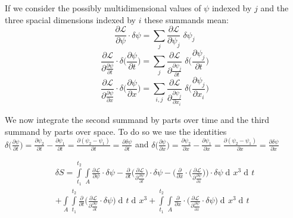 \documentclass{article}
\DeclareMathOperator{\dd}{d\!}
\begin{document}
If we consider the possibly multidimensional values of $\psi$ indexed by $j$ and the three spacial dimensions indexed by $i$ these summands mean:
\begin{equation}
\frac{\partial \mathcal{L}}{\partial \psi} \cdot \delta \psi 
= \sum_{j} \frac{\partial \mathcal{L}}{\partial \psi_{j}} \; \delta \psi_{j} 
\end{equation}
\begin{equation}
\frac{\partial \mathcal{L}}{\partial \frac{\partial \psi}{\partial t}} \cdot \delta \bigg(\frac{\partial \psi} {\partial t}\bigg)
= \sum_{j} \frac{\partial \mathcal{L}}{\partial \frac{\partial \psi_{j}}{\partial t}} \; \delta \bigg(\frac{\partial \psi_{j}} {\partial t}\bigg)
\end{equation}
\begin{equation}
\frac{\partial \mathcal{L}}{\partial \frac{\partial \psi}{\partial x}} \cdot \delta \bigg(\frac{\partial \psi} {\partial x}\bigg)
= \sum_{i,j} \frac{\partial \mathcal{L}}{\partial \frac{\partial \psi_{j}}{\partial x_{i}}} \; \delta \bigg(\frac{\partial \psi_{j}} {\partial x_{i}}\bigg)
\end{equation}

We now integrate the second summand by parts over time and the third summand by parts over space. To do so we use the identities 
$\delta \big(\frac{\partial \psi} {\partial t}\big)
= \frac{\partial \psi_2} {\partial t} - \frac{\partial \psi_1} {\partial t}
= \frac{\partial (\psi_2 - \psi_1)} {\partial t}
= \frac{\partial \delta \psi} {\partial t}$ 
and
$\delta \big(\frac{\partial \psi} {\partial x}\big)
= \frac{\partial \psi_2} {\partial x} - \frac{\partial \psi_1} {\partial x}
= \frac{\partial (\psi_2 - \psi_1)} {\partial x}
= \frac{\partial \delta \psi} {\partial x}$ 

\begin{equation} \label{calcDeltaSSection2}
\begin{split}
\delta S = \int\limits_{t_1}^{t_2} \int\limits_{A} 
\frac{\partial \mathcal{L}}{\partial \psi} \cdot \delta \psi
-\frac{\partial}{\partial t} \bigg( \frac{\partial \mathcal{L}}{\partial \frac{\partial \psi}{\partial t}} \bigg) \cdot \delta \psi
-\bigg(\frac{\partial}{\partial x} \cdot \bigg( \frac{\partial \mathcal{L}}{\partial \frac{\partial \psi}{\partial x}} \bigg)\bigg) \cdot \delta \psi
\dd x^3 \dd t \\
+ \int\limits_{A} \int\limits_{t_1}^{t_2} \frac{\partial}{\partial t} \bigg(\frac{\partial \mathcal{L}}{\partial \frac{\partial \psi}{\partial t}} \cdot \delta \psi \bigg) \dd t \dd x^3
+ \int\limits_{t_1}^{t_2} 
\int\limits_{A} \frac{\partial}{\partial x} \cdot \bigg( \frac{\partial \mathcal{L}}{\partial \frac{\partial \psi}{\partial x}} \cdot \delta \psi \bigg) \dd x^3  \dd t
\end{split}
\end{equation}
\end{document}

